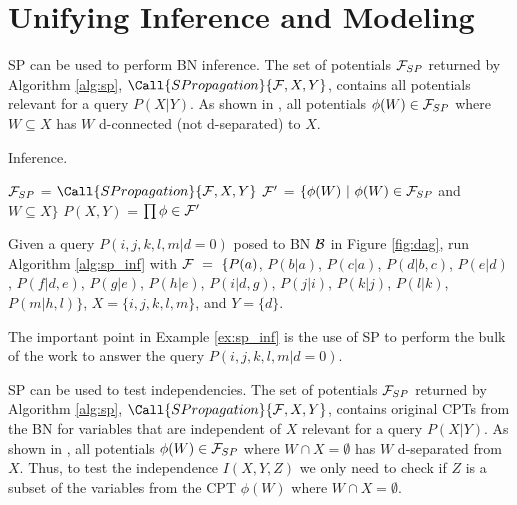 \section{Unifying Inference and Modeling}
\label{sec:new}

SP can be used to perform BN inference.
The set of potentials ${\cal F}_{SP}$ returned by Algorithm \ref{alg:sp}, $\Call{SPropagation}{{\cal F},X,Y}$, contains all potentials relevant for a query $P(X|Y)$.
As shown in \cite{butzetal16}, all potentials $\phi(W) \in {\cal F}_{SP}$ where $W \subseteq X$ has $W$ d-connected (not d-separated) to $X$.

\begin{algorithm}[htb]
    \caption{Inference.}
    \label{alg:sp_inf}
    \begin{algorithmic}[1]
    \State ${\cal F}_{SP}$ = $\Call{SPropagation}{{\cal F}, X, Y}$
    \State ${\cal F}^\prime$ = $\{\phi(W) ~|~ \phi(W) \in {\cal F}_{SP}$ and $W \subseteq X\}$
    \State $P(X,Y)$ = $\prod{\phi \in {\cal F}^\prime}$    
    \EndProcedure
    \end{algorithmic}
\end{algorithm}

\begin{example}
Given a query $P(i,j,k,l,m | d=0)$ posed to BN ${\cal B}$ in Figure \ref{fig:dag}, run Algorithm \ref{alg:sp_inf} with ${\cal F} ~=~ \{P(a)$, $P(b|a)$, $P(c|a)$, $P(d|b,c)$, $P(e|d)$, $P(f|d,e)$, $P(g|e)$, $P(h|e)$, $P(i|d,g)$, $P(j|i)$, $P(k|j)$, $P(l|k)$, $P(m|h,l)\}$, $X = \{i,j,k,l,m\}$, and $Y = \{d\}$.
\label{ex:sp_inf}
\end{example}

The important point in Example \ref{ex:sp_inf} is the use of SP to perform the bulk of the work to answer the query $P(i,j,k,l,m | d=0)$.

SP can be used to test independencies.
The set of potentials ${\cal F}_{SP}$ returned by Algorithm \ref{alg:sp}, $\Call{SPropagation}{{\cal F},X,Y}$, contains original CPTs from the BN for variables that are independent of $X$    relevant for a query $P(X|Y)$.
As shown in \cite{butzetal16}, all potentials $\phi(W) \in {\cal F}_{SP}$ where $W \cap X = \emptyset$ has $W$ d-separated from $X$.
Thus, to test the independence $I(X,Y,Z)$ we only need to check if $Z$ is a subset of the variables from the CPT $\phi(W)$ where $W \cap X = \emptyset$.

